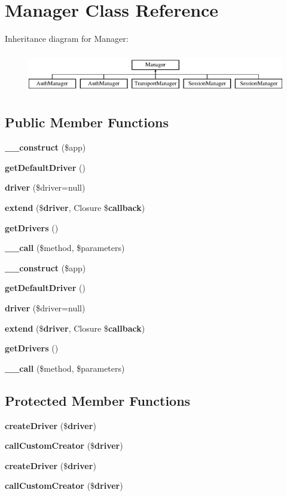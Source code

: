 \section{Manager Class Reference}
\label{class_illuminate_1_1_support_1_1_manager}
Inheritance diagram for Manager\+:\begin{figure}[H]
\begin{center}
\leavevmode
\includegraphics[height=1.792000cm]{class_illuminate_1_1_support_1_1_manager}
\end{center}
\end{figure}
\subsection*{Public Member Functions}
\begin{DoxyCompactItemize}
\item 
{\bf \+\_\+\+\_\+construct} (\$app)
\item 
{\bf get\+Default\+Driver} ()
\item 
{\bf driver} (\$driver=null)
\item 
{\bf extend} (\${\bf driver}, Closure \${\bf callback})
\item 
{\bf get\+Drivers} ()
\item 
{\bf \+\_\+\+\_\+call} (\$method, \$parameters)
\item 
{\bf \+\_\+\+\_\+construct} (\$app)
\item 
{\bf get\+Default\+Driver} ()
\item 
{\bf driver} (\$driver=null)
\item 
{\bf extend} (\${\bf driver}, Closure \${\bf callback})
\item 
{\bf get\+Drivers} ()
\item 
{\bf \+\_\+\+\_\+call} (\$method, \$parameters)
\end{DoxyCompactItemize}
\subsection*{Protected Member Functions}
\begin{DoxyCompactItemize}
\item 
{\bf create\+Driver} (\${\bf driver})
\item 
{\bf call\+Custom\+Creator} (\${\bf driver})
\item 
{\bf create\+Driver} (\${\bf driver})
\item 
{\bf call\+Custom\+Creator} (\${\bf driver})
\end{DoxyCompactItemize}
